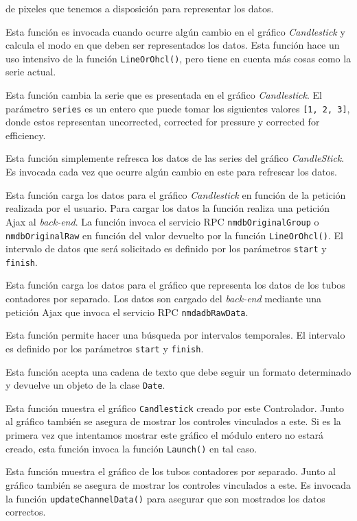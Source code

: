 \begin{description}[style=unboxed,leftmargin=0cm]
			  de pixeles que tenemos a disposición para representar los datos.
			\item[\texttt{updateMode(start, finish)}] Esta función es invocada cuando ocurre algún cambio en el gráfico \emph{Candlestick}
			  y calcula el modo en que deben ser representados los datos. Esta función hace un uso intensivo de la función
			  \texttt{LineOrOhcl()}, pero tiene en cuenta más cosas como la serie actual.
			\item[\texttt{changeSeries(series)}] Esta función cambia la serie que es presentada en el gráfico \emph{Candlestick}. El
			  parámetro \texttt{series} es un entero que puede tomar los siguientes valores \texttt{[1, 2, 3]}, donde estos representan
			  uncorrected, corrected for pressure y corrected for efficiency.
			\item[\texttt{updateSeries()}] Esta función simplemente refresca los datos de las series del gráfico \emph{CandleStick}. Es
			  invocada cada vez que ocurre algún cambio en este para refrescar los datos.
			\item[\texttt{updateCandleData(start, finish)}] Esta función carga los datos para el gráfico \emph{Candlestick} en función de
			  la petición realizada por el usuario. Para cargar los datos la función realiza una petición Ajax al \emph{back-end}. La
			  función invoca el servicio RPC \texttt{nmdbOriginalGroup} o \texttt{nmdbOriginalRaw} en función del valor devuelto por la
			  función \texttt{LineOrOhcl()}. El intervalo de datos que será solicitado es definido por los parámetros \texttt{start} y
			  \texttt{finish}. 
			\item[\texttt{updateChannelData()}] Esta función carga los datos para el gráfico que representa los datos de los tubos
			  contadores por separado. Los datos son cargado del \emph{back-end} mediante una petición Ajax que invoca el servicio RPC
			  \texttt{nmdadbRawData}.
			\item[\texttt{searchInterval(start, finish)}] Esta función permite hacer una búsqueda por intervalos temporales. El intervalo
			  es definido por los parámetros \texttt{start} y \texttt{finish}.
			\item[\texttt{getTimestamp(str)}] Esta función acepta una cadena de texto que debe seguir un formato determinado y devuelve un
			  objeto de la clase \texttt{Date}. 
			\item[\texttt{showCandle()}] Esta función muestra el gráfico \texttt{Candlestick} creado por este Controlador. Junto al
			  gráfico también se asegura de mostrar los controles vinculados a este. Si es la primera vez que intentamos mostrar este
			  gráfico el módulo entero no estará creado, esta función invoca la función \texttt{Launch()} en tal caso.
			\item[\texttt{showChannel()}] Esta función muestra el gráfico de los tubos contadores por separado. Junto al gráfico también
			  se asegura de mostrar los controles vinculados a este. Es invocada la función \texttt{updateChannelData()} para asegurar que
			  son mostrados los datos correctos.
		\end{description}
